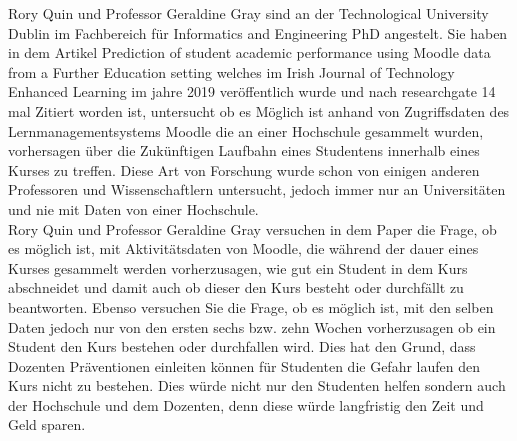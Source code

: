 \begin{comment}
Viele Systeme erzeugen während sie benutzt werden Daten, auch genannt Zugriffsdaten.
Diese Daten werden gespeichert und genutzt um Informationen über die Benutzer zu gelangen. 
Solche Informationen können benutzt werden um neue Produkte zu erschaffen oder zu verbessern.
Zurgiffsdaten werden auch von Systemen, die in der Bildung eingesetzt werden gesammelt z. B Lernmanagementsysteme - oder auch virtuelle Lernumgebungen oder Kursmanagemensysteme genannt - wie Moodle.
Die Aufgabe von Bildungsintitutionen ist es, die Daten zu Nutzen, um das Lehren und lernen zu verbessern.
\end{comment}
Rory Quin und Professor Geraldine Gray sind an der \glqq Technological University Dublin\grqq{} im Fachbereich für \glqq Informatics and Engineering
PhD \grqq{} angestelt. Sie haben in dem Artikel \glqq Prediction of student academic performance using Moodle data from a Further Education setting\grqq{} welches im Irish Journal of Technology Enhanced Learning im jahre 2019 veröffentlich wurde und nach researchgate 14 mal Zitiert worden ist, untersucht ob es Möglich ist anhand von Zugriffsdaten des Lernmanagementsystems Moodle die an einer Hochschule gesammelt wurden,
vorhersagen über die Zukünftigen Laufbahn eines Studentens innerhalb eines Kurses zu treffen. Diese Art von Forschung wurde schon von einigen anderen Professoren und Wissenschaftlern untersucht, jedoch immer nur an Universitäten und nie mit Daten von einer Hochschule.
\\ \noindent
Rory Quin und Professor Geraldine Gray versuchen in dem Paper die Frage, ob es möglich ist, mit Aktivitätsdaten von Moodle, die während der dauer eines Kurses gesammelt werden vorherzusagen, wie gut ein Student in dem Kurs abschneidet und damit auch ob dieser den Kurs besteht oder durchfällt zu beantworten. 
Ebenso versuchen Sie die Frage, ob es möglich ist, mit den selben Daten jedoch nur von den ersten sechs bzw. zehn Wochen vorherzusagen ob ein Student den Kurs bestehen oder durchfallen wird.
Dies hat den Grund, dass Dozenten Präventionen einleiten können für Studenten die Gefahr laufen den Kurs nicht zu bestehen. Dies würde nicht nur den Studenten helfen sondern auch der Hochschule und dem Dozenten, denn diese würde langfristig den Zeit und Geld sparen.

